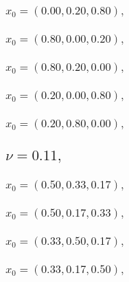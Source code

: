 \documentclass[a4paper]{article}
\begin{document}
\begin{multicols*}{2}
   \subsubsection{\(x_0 = (0.00,0.20,0.80),\quad \)}
   

   \subsubsection{\(x_0 = (0.80,0.00,0.20),\quad \)}
   

   \subsubsection{\(x_0 = (0.80,0.20,0.00),\quad \)}
   

   \subsubsection{\(x_0 = (0.20,0.00,0.80),\quad \)}
   

   \subsubsection{\(x_0 = (0.20,0.80,0.00),\quad \)}
   

   \subsection{\(\nu = 0.11,\quad \)}
   

   \subsubsection{\(x_0 = (0.50,0.33,0.17),\quad \)}
   

   \subsubsection{\(x_0 = (0.50,0.17,0.33),\quad \)}
   

   \subsubsection{\(x_0 = (0.33,0.50,0.17),\quad \)}
   

   \subsubsection{\(x_0 = (0.33,0.17,0.50),\quad \)}
   


\end{multicols*}
\end{document}
